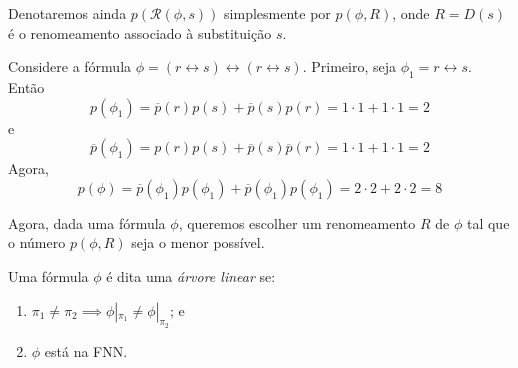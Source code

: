 
Denotaremos ainda $p(\mathcal{R}(\phi,s))$ simplesmente por $p(\phi,R)$, onde $R = D(s)$ é o renomeamento associado à substituição $s$.

\begin{example}
	Considere a fórmula $\phi = (r \leftrightarrow s) \leftrightarrow (r \leftrightarrow s)$. Primeiro, seja $\phi_1 = r \leftrightarrow s$. Então $$p(\phi_1) = \overline{p}(r)p(s) + \overline{p}(s)p(r) = 1 \cdot 1 + 1 \cdot 1 = 2$$ e $$\overline{p}(\phi_1) = p(r)p(s) + \overline{p}(s)\overline{p}(r) = 1 \cdot 1 + 1 \cdot 1 = 2$$ Agora, $$p(\phi) = \overline{p}(\phi_1)p(\phi_1) + \overline{p}(\phi_1)p(\phi_1) = 2 \cdot 2 + 2 \cdot 2 = 8$$
\end{example}

Agora, dada uma fórmula $\phi$, queremos escolher um renomeamento $R$ de $\phi$ tal que o número $p(\phi,R)$ seja o menor possível.

\begin{definition}
	Uma fórmula $\phi$ é dita uma \emph{árvore linear} se:
	\begin{enumerate}
		\item $\pi_1 \neq \pi_2 \implies \phi|_{\pi_1} \neq \phi|_{\pi_2}$; e
		\item $\phi$ está na FNN.
	\end{enumerate}
\end{definition}

